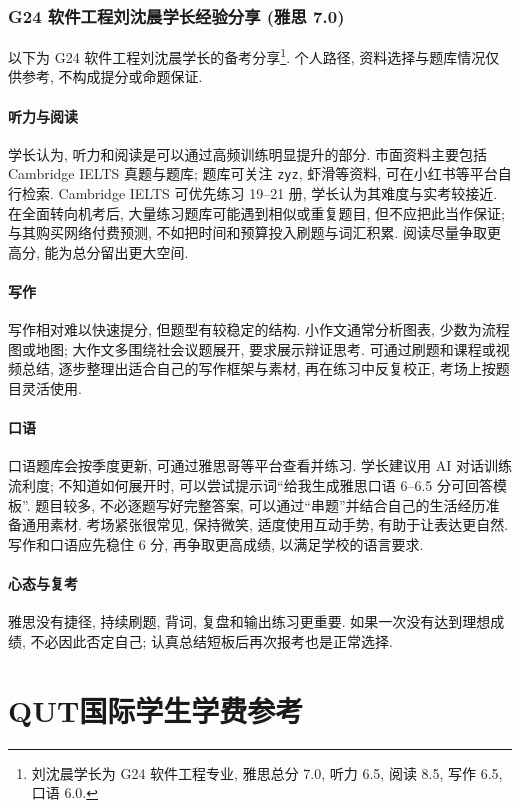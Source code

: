 \documentclass[UTF8,a4paper,12pt]{ctexart}
\newif\ifcourseopen
\newif\ifcourseheaderprinted
\newcounter{courseitem}
\newcommand{\finishcourse}{%
 \ifcourseopen
 \par\end{minipage}\end{tcolorbox}%
 \courseopenfalse
 \fi
}
\newcommand{\coursereset}{\finishcourse\setcounter{courseitem}{0}\courseheaderprintedfalse}
\let\origsection\section
\renewcommand{\section}{\coursereset\origsection}
\let\origsubsubsection\subsubsection
\renewcommand{\subsubsection}{\coursereset\origsubsubsection}
\let\origclearpage\clearpage
\renewcommand{\clearpage}{\finishcourse\origclearpage}
\begin{document}
\subsubsection{G24 软件工程刘沈晨学长经验分享 (雅思 7.0)}

以下为 G24 软件工程刘沈晨学长的备考分享\footnote{刘沈晨学长为 G24 软件工程专业, 雅思总分 7.0, 听力 6.5, 阅读 8.5, 写作 6.5, 口语 6.0.}. 个人路径, 资料选择与题库情况仅供参考, 不构成提分或命题保证.

\paragraph{听力与阅读} 学长认为, 听力和阅读是可以通过高频训练明显提升的部分. 市面资料主要包括 Cambridge IELTS 真题与题库; 题库可关注 \texttt{zyz}, 虾滑等资料, 可在小红书等平台自行检索. Cambridge IELTS 可优先练习 19--21 册, 学长认为其难度与实考较接近. 在全面转向机考后, 大量练习题库可能遇到相似或重复题目, 但不应把此当作保证; 与其购买网络付费预测, 不如把时间和预算投入刷题与词汇积累. 阅读尽量争取更高分, 能为总分留出更大空间.

\paragraph{写作} 写作相对难以快速提分, 但题型有较稳定的结构. 小作文通常分析图表, 少数为流程图或地图; 大作文多围绕社会议题展开, 要求展示辩证思考. 可通过刷题和课程或视频总结, 逐步整理出适合自己的写作框架与素材, 再在练习中反复校正, 考场上按题目灵活使用.

\paragraph{口语} 口语题库会按季度更新, 可通过雅思哥等平台查看并练习. 学长建议用 AI 对话训练流利度; 不知道如何展开时, 可以尝试提示词``给我生成雅思口语 6--6.5 分可回答模板''. 题目较多, 不必逐题写好完整答案, 可以通过``串题''并结合自己的生活经历准备通用素材. 考场紧张很常见, 保持微笑, 适度使用互动手势, 有助于让表达更自然. 写作和口语应先稳住 6 分, 再争取更高成绩, 以满足学校的语言要求.

\paragraph{心态与复考} 雅思没有捷径, 持续刷题, 背词, 复盘和输出练习更重要. 如果一次没有达到理想成绩, 不必因此否定自己; 认真总结短板后再次报考也是正常选择.

\appendix
\clearpage
\section{QUT国际学生学费参考}\label{app:qut-fees}
\end{document}
